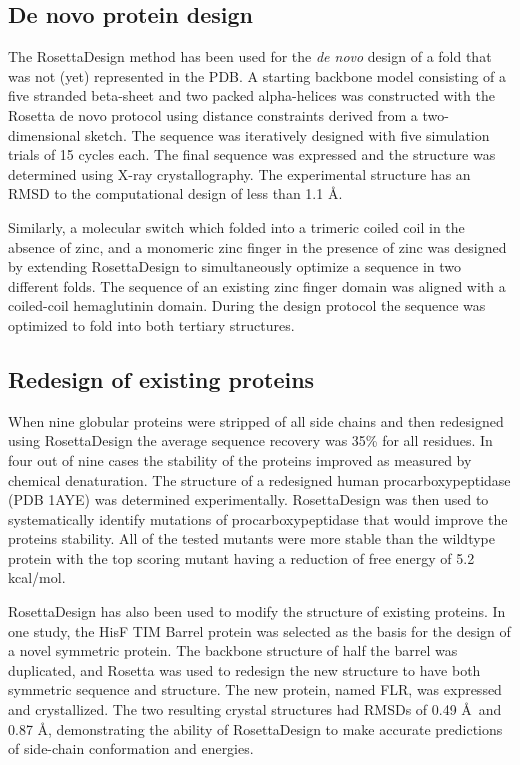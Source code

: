 \subsection{De novo protein design}

The RosettaDesign method has been used for the \textit{de novo} design of a fold that was not (yet) represented in the PDB.
A starting backbone model consisting of a five stranded beta-sheet and two packed alpha-helices was constructed with the Rosetta de novo protocol using distance constraints derived from a two-dimensional sketch\citep{Rohl:2004dh}.
The sequence was iteratively designed with five simulation trials of 15 cycles each.
The final sequence was expressed and the structure was determined using X-ray crystallography.
The experimental structure has an RMSD to the computational design of less than 1.1 \AA\citep{Kuhlman:2003kp}. 

Similarly, a molecular switch which folded into a trimeric coiled coil in the absence of zinc, and a monomeric zinc finger in the presence of zinc was designed by extending RosettaDesign to simultaneously optimize a sequence in two different folds.
The sequence of an existing zinc finger domain was aligned with a coiled-coil hemaglutinin domain.
During the design protocol the sequence was optimized to fold into both tertiary structures\citep{Ambroggio:2006he}.

\subsection{Redesign of existing proteins}
When nine globular proteins were stripped of all side chains and then redesigned using RosettaDesign the average sequence recovery was 35\% for all residues\citep{Kuhlman:2003kp}.
In four out of nine cases the stability of the proteins improved as measured by chemical denaturation.
The structure of a redesigned human procarboxypeptidase (PDB 1AYE)\citep{GarciaSaez:1997cn} was determined experimentally.
RosettaDesign was then used to systematically identify mutations of procarboxypeptidase that would improve the proteins stability.
All of the tested mutants were more stable than the wildtype protein with the top scoring mutant having a reduction of free energy of 5.2 kcal/mol\citep{Dantas:2007iq}.

RosettaDesign has also been used to modify the structure of existing proteins.
In one study, the HisF TIM Barrel protein was selected as the basis for the design of a novel symmetric protein.
The backbone structure of half the barrel was duplicated, and Rosetta was used to redesign the new structure to have both symmetric sequence and structure.
The new protein, named FLR, was expressed and crystallized.
The two resulting crystal structures had RMSDs of 0.49 \AA\ and 0.87 \AA, demonstrating the ability of RosettaDesign to make accurate predictions of side-chain conformation and energies\citep{Fortenberry:2011hw}.

